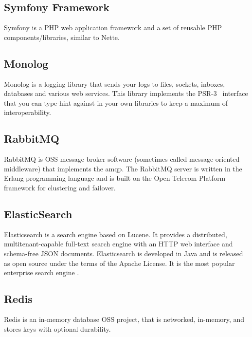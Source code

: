 \subsection{Symfony Framework} \label{sec:theory:symfony}

Symfony is a PHP web application framework and a set of reusable PHP components/libraries, similar to Nette.~\cite{wiki:symfony}

\subsection{Monolog} \label{sec:theory:monolog}

Monolog is a logging library that sends your logs to files, sockets, inboxes, databases and various web services. This library implements the PSR-3~\cite{fig:psr} interface that you can type-hint against in your own libraries to keep a maximum of interoperability.~\cite{monolog:readme}

\subsection{RabbitMQ} \label{sec:theory:rabbitmq}

RabbitMQ is OSS message broker software (sometimes called message-oriented middleware) that implements the \gls{amqp}. The RabbitMQ server is written in the Erlang programming language and is built on the Open Telecom Platform framework for clustering and failover.~\cite{wiki:rabbitmq}

\subsection{ElasticSearch} \label{sec:theory:elasticsearch}

Elasticsearch is a search engine based on Lucene. It provides a distributed, multitenant-capable full-text search engine with an HTTP web interface and schema-free JSON documents. Elasticsearch is developed in Java and is released as open source under the terms of the Apache License. It is the most popular enterprise search engine .~\cite{wiki:elasticsearch}

\subsection{Redis} \label{sec:theory:redis}

Redis is an in-memory database OSS project, that is networked, in-memory, and stores keys with optional durability.~\cite{wiki:redis}

